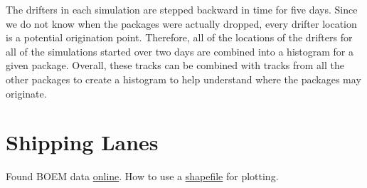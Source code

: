 \documentclass[11pt]{article}
\begin{document}
The drifters in each simulation are stepped backward in time for five days. Since we do not know when the packages were actually dropped, every drifter location is a potential origination point. Therefore, all of the locations of the drifters for all of the simulations started over two days are combined into a histogram for a given package. Overall, these tracks can be combined with tracks from all the other packages to create a histogram to help understand where the packages may originate.

\section{Shipping Lanes}

Found BOEM data \href{http://www.data.boem.gov/homepg/data_center/mapping/geographic_mapping.asp}{online}. How to use a \href{http://www.packtpub.com/article/plotting-geographical-data-using-basemap}{shapefile} for plotting.
\end{document}
